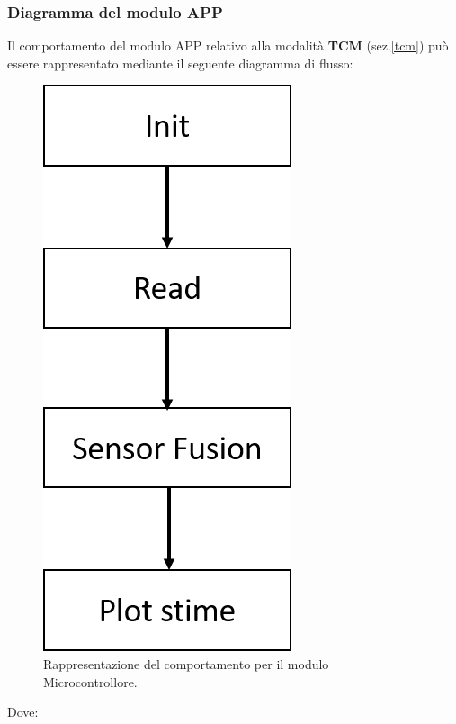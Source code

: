 \subsubsection{Diagramma del modulo APP}
Il comportamento del modulo APP relativo alla modalità \textbf{TCM} (sez.\ref{tcm}) può essere rappresentato mediante il seguente diagramma di flusso:
\begin{figure}[H]  
	\centering 
	\includegraphics[scale=0.4]{implementazione/diagrammaApp.png}
	\caption{Rappresentazione del comportamento per il modulo Microcontrollore.}
	\label{fig:diagrammaAPP}
\end{figure}
Dove:
